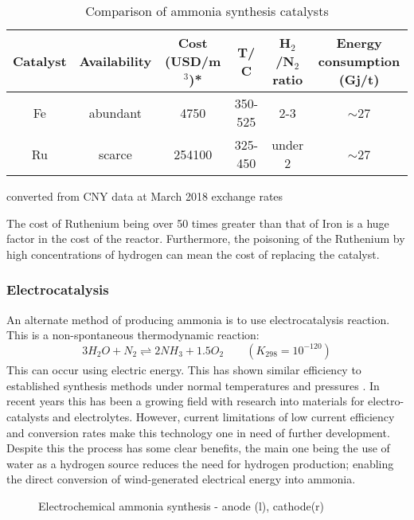{\renewcommand{\arraystretch}{1.4}
\begin{table}[!htbp]
	\begin{center}
	\label{tab:cat}
\caption{Comparison of ammonia synthesis catalysts}

	\begin{tabular}{|c|c|c|c|c|c|}
	\hline
	Catalyst& Availability & Cost (USD/m$^3$)* & T/ \textdegree C     & H$_2$/N$_2$ ratio & Energy consumption (Gj/t) \\ \hline
	Fe            & abundant              & 4750                          & 350-525 & 2-3             & $\sim$27                      \\ \hline
	Ru            & scarce                & 254100                        & 325-450 & under 2         & $\sim$27                      \\ \hline
\end{tabular}
{\small *converted from CNY data at March 2018 exchange rates}

\end{center}
\end{table}

The cost of Ruthenium being over 50 times greater than that of Iron is a huge factor in the cost of the reactor. Furthermore, the poisoning of the Ruthenium by high concentrations of hydrogen can mean the cost of replacing the catalyst.

\subsubsection{Electrocatalysis}
An alternate method of producing ammonia is to use electrocatalysis reaction. This is a non-spontaneous thermodynamic reaction:
\begin{equation}
3H_2O+N_2   \underset{ }{\stackrel{ }{\rightleftharpoons}}   2NH_3 + 1.5O_2 \qquad (K_{298} = 10^{-120})
\end{equation}	
This can occur using electric energy. This has shown similar efficiency to established synthesis methods under normal temperatures and pressures \cite{Liu2014}. In recent years this has been a growing field with research into materials for electro-catalysts and electrolytes. However, current limitations of low current efficiency and conversion rates make this technology one in need of further development. Despite this the process has some clear benefits, the main one being the use of water as a hydrogen source reduces the need for hydrogen production; enabling the direct conversion of  wind-generated electrical energy into ammonia.
{\begin{figure}[h]
		\centering
		\caption{Electrochemical ammonia synthesis - anode (l), cathode(r)  \cite{Kyriakou2017}}
		{\centering
			
}
\end{figure}}}
